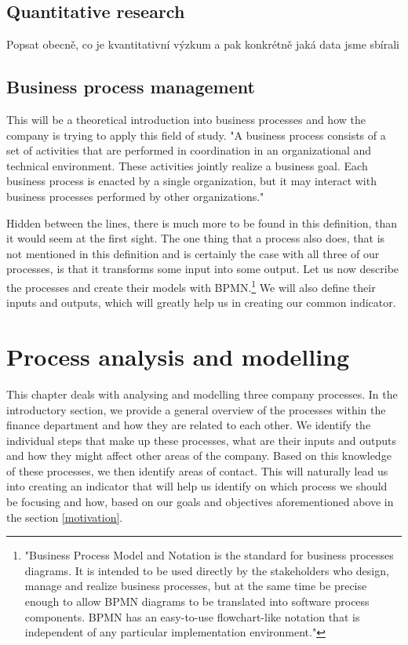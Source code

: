 \documentclass[12pt,oneside]{fithesis2}
\begin{document}
\section{Quantitative research}
Popsat obecně, co je kvantitativní výzkum a pak konkrétně jaká data jsme sbírali
\section{Business process management}
This will be a theoretical introduction into business processes and how the company is trying to apply this field of study.
"A business process consists of a set of activities that are performed in coordination in an organizational and technical environment. These activities jointly realize a business goal. Each business process is enacted by a single organization, but it may interact with business processes performed by other organizations."\cite{weske2007business}
\par
Hidden between the lines, there is much more to be found in this definition, than it would seem at the first sight. The one thing that a process also does, that is not mentioned in this definition and is certainly the case with all three of our processes, is that it transforms some input into some output. Let us now describe the processes and create their models with BPMN.\footnote{"Business Process Model and Notation is the standard for business processes diagrams. It is intended to be used directly by the stakeholders who design, manage and realize business processes, but at the same time be precise enough to allow BPMN diagrams to be translated into software process components. BPMN has an easy-to-use flowchart-like notation that is independent of any particular implementation environment."\cite{bpmn}} We will also define their inputs and outputs, which will greatly help us in creating our common indicator.
\chapter{Process analysis and modelling}
This chapter deals with analysing and modelling three company processes. In the introductory section, we provide a general overview of the processes within the finance department and how they are related to each other. We identify the individual steps that make up these processes, what are their inputs and outputs and how they might affect other areas of the company. Based on this knowledge of these processes, we then identify areas of contact. This will naturally lead us into creating an indicator that will help us identify on which process we should be focusing and how, based on our goals and objectives aforementioned above in the section \ref{motivation}.
\end{document}
